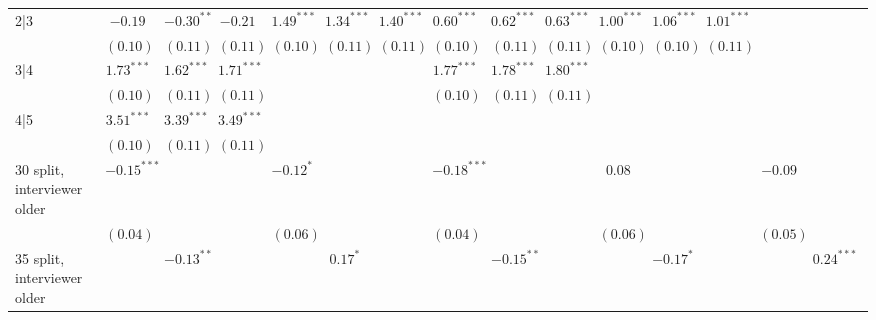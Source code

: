 \begin{table}
\begin{center}
\begin{threeparttable}
\begin{tabular}{l c c c c c c c c c c c c c c c}
2|3                             & $-0.19$       & $-0.30^{**}$  & $-0.21$       & $1.49^{***}$  & $1.34^{***}$  & $1.40^{***}$  & $0.60^{***}$  & $0.62^{***}$  & $0.63^{***}$  & $1.00^{***}$  & $1.06^{***}$  & $1.01^{***}$  &               &               &               \\
                                & $(0.10)$      & $(0.11)$      & $(0.11)$      & $(0.10)$      & $(0.11)$      & $(0.11)$      & $(0.10)$      & $(0.11)$      & $(0.11)$      & $(0.10)$      & $(0.10)$      & $(0.11)$      &               &               &               \\
3|4                             & $1.73^{***}$  & $1.62^{***}$  & $1.71^{***}$  &               &               &               & $1.77^{***}$  & $1.78^{***}$  & $1.80^{***}$  &               &               &               &               &               &               \\
                                & $(0.10)$      & $(0.11)$      & $(0.11)$      &               &               &               & $(0.10)$      & $(0.11)$      & $(0.11)$      &               &               &               &               &               &               \\
4|5                             & $3.51^{***}$  & $3.39^{***}$  & $3.49^{***}$  &               &               &               &               &               &               &               &               &               &               &               &               \\
                                & $(0.10)$      & $(0.11)$      & $(0.11)$      &               &               &               &               &               &               &               &               &               &               &               &               \\
30 split, interviewer older     & $-0.15^{***}$ &               &               & $-0.12^{*}$   &               &               & $-0.18^{***}$ &               &               & $0.08$        &               &               & $-0.09$       &               &               \\
                                & $(0.04)$      &               &               & $(0.06)$      &               &               & $(0.04)$      &               &               & $(0.06)$      &               &               & $(0.05)$      &               &               \\
35 split, interviewer older     &               & $-0.13^{**}$  &               &               & $0.17^{*}$    &               &               & $-0.15^{**}$  &               &               & $-0.17^{*}$   &               &               & $0.24^{***}$  &               \\

\end{tabular}
\end{threeparttable}
\end{center}
\end{table}
